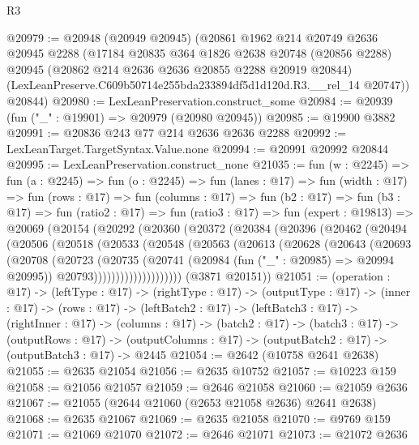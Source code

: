 \begin{lexlean}{R3}
\begin{coremodule}
@20979 := @20948
    (@20949 @20945)
    (@20861
      @1962
      @214
      @20749
      @2636
      @20945
      @2288
      (@17184
        @20835
        @364
        @1826
        @2638
        @20748
        (@20856 @2288)
        @20945
        (@20862 @214 @2636 @2636 @20855 @2288 @20919 @20844)
        (LexLeanPreserve.C609b50714e255bda233894df5d1d120d.R3.__rel_14 @20747))
      @20844)
@20980 := LexLeanPreservation.construct_some
@20984 := @20939 (fun ("_" : @19901) => @20979 (@20980 @20945))
@20985 := @19900 @3882
@20991 := @20836 @243 @77 @214 @2636 @2636 @2288
@20992 := LexLeanTarget.TargetSyntax.Value.none
@20994 := @20991 @20992 @20844
@20995 := LexLeanPreservation.construct_none
@21035 := fun (w : @2245) =>
  fun (a : @2245) =>
  fun (o : @2245) =>
  fun (lanes : @17) =>
  fun (width : @17) =>
  fun (rows : @17) =>
  fun (columns : @17) =>
  fun (b2 : @17) =>
  fun (b3 : @17) =>
  fun (ratio2 : @17) =>
  fun (ratio3 : @17) =>
  fun (expert : @19813) =>
  @20069
    (@20154
      (@20292
        (@20360
          (@20372
            (@20384
              (@20396
                (@20462
                  (@20494
                    (@20506
                      (@20518
                        (@20533
                          (@20548
                            (@20563
                              (@20613
                                (@20628
                                  (@20643
                                    (@20693
                                      (@20708
                                        (@20723
                                          (@20735
                                            (@20741
                                              (@20984 (fun ("_" : @20985) => @20994 @20995))
                                              @20793))))))))))))))))))))
      (@3871 @20151))
@21051 := (operation : @17) ->
  (leftType : @17) ->
  (rightType : @17) ->
  (outputType : @17) ->
  (inner : @17) ->
  (rows : @17) ->
  (leftBatch2 : @17) ->
  (leftBatch3 : @17) ->
  (rightInner : @17) ->
  (columns : @17) ->
  (batch2 : @17) ->
  (batch3 : @17) ->
  (outputRows : @17) ->
  (outputColumns : @17) -> (outputBatch2 : @17) -> (outputBatch3 : @17) -> @2445
@21054 := @2642 (@10758 @2641 @2638)
@21055 := @2635 @21054
@21056 := @2635 @10752
@21057 := @10223 @159
@21058 := @21056 @21057
@21059 := @2646 @21058
@21060 := @21059 @2636
@21067 := @21055 (@2644 @21060 (@2653 @21058 @2636) @2641 @2638)
@21068 := @2635 @21067
@21069 := @2635 @21058
@21070 := @9769 @159
@21071 := @21069 @21070
@21072 := @2646 @21071
@21073 := @21072 @2636

\end{coremodule}
\end{lexlean}
